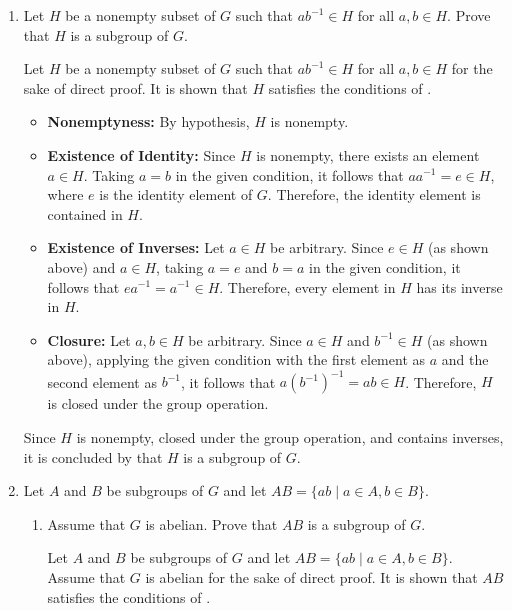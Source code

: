 \begin{enumerate}
  
  \item Let $H$ be a nonempty subset of $G$ such that $a b^{-1} \in H$ for all $a, b \in H$. Prove that $H$ is a subgroup of $G$.
  \begin{subprove}
    Let $H$ be a nonempty subset of $G$ such that $a b^{-1} \in H$ for all $a, b \in H$ for the sake of direct proof.
    It is shown that $H$ satisfies the conditions of .
    
    \begin{itemize}
      \item \textbf{Nonemptyness:} By hypothesis, $H$ is nonempty.
      
      \item \textbf{Existence of Identity:} Since $H$ is nonempty, there exists an element $a \in H$.
      Taking $a = b$ in the given condition, it follows that $a a^{-1} = e \in H$, where $e$ is the identity element of $G$.
      Therefore, the identity element is contained in $H$.
      
      \item \textbf{Existence of Inverses:} Let $a \in H$ be arbitrary.
      Since $e \in H$ (as shown above) and $a \in H$, taking $a = e$ and $b = a$ in the given condition, 
      it follows that $e a^{-1} = a^{-1} \in H$.
      Therefore, every element in $H$ has its inverse in $H$.
      
      \item \textbf{Closure:} Let $a, b \in H$ be arbitrary.
      Since $a \in H$ and $b^{-1} \in H$ (as shown above), applying the given condition with the first element as $a$ and the second element as $b^{-1}$,
      it follows that $a (b^{-1})^{-1} = a b \in H$.
      Therefore, $H$ is closed under the group operation.
    \end{itemize}
    
    Since $H$ is nonempty, closed under the group operation, and contains inverses, 
    it is concluded by  that $H$ is a subgroup of $G$.
  \end{subprove}








  \newpage



  \item Let $A$ and $B$ be subgroups of $G$ and let $A B=\{a b \mid a \in A, b \in B\}$.
  \begin{enumerate}
    \item Assume that $G$ is abelian. Prove that $A B$ is a subgroup of $G$.
    \begin{subprove}
      Let $A$ and $B$ be subgroups of $G$ and let $A B = \{a b \mid a \in A, b \in B\}$.
      Assume that $G$ is abelian for the sake of direct proof.
      It is shown that $A B$ satisfies the conditions of .
      

\end{subprove}
\end{enumerate}
\end{enumerate}
